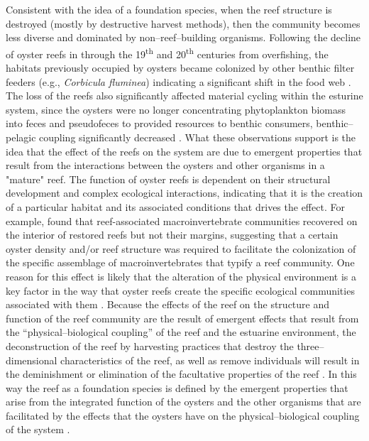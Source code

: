\documentclass{article}
\begin{document}
Consistent with the idea of a foundation species, when the reef structure is destroyed (mostly by destructive harvest methods), then the community becomes less diverse and dominated by non--reef--building organisms. Following the decline of oyster reefs in through the 19\textsuperscript{th} and 20\textsuperscript{th} centuries from overfishing, the habitats previously occupied by oysters became colonized by other benthic filter feeders (e.g., \emph{Corbicula fluminea}) indicating a significant shift in the food web \cite{newell_ecological_1988}. The loss of the reefs also significantly affected material cycling within the esturine system, since the oysters were no longer concentrating phytoplankton biomass into feces and pseudofeces to provided resources to benthic consumers, benthic--pelagic coupling significantly decreased \cite{newell_ecological_1988}. What these observations support is the idea that the effect of the reefs on the system are due to emergent properties that result from the interactions between the oysters and other organisms in a "mature" reef. The function of oyster reefs is dependent on their structural development and complex ecological interactions, indicating that it is the creation of a particular habitat and its associated conditions that drives the effect. For example,  found that reef-associated macroinvertebrate communities recovered on the interior of restored reefs but not their margins, suggesting that a certain oyster density and/or reef structure was required to facilitate the colonization of the specific assemblage of  macroinvertebrates that typify a reef community. One reason for this effect is likely that the alteration of the physical environment is a key factor in the way that oyster reefs create the specific ecological communities associated with them \cite{lenihan_physicalbiological_1999, searles_oyster_2022}. Because the effects of the reef on the structure and function of the reef community are the result of emergent effects that result from the ``physical--biological coupling'' of the reef and the estuarine environment, the deconstruction of the reef by harvesting practices that destroy the three--dimensional characteristics of the reef, as well as remove individuals will result in the deminishment or elimination of the facultative properties of the reef \cite{lenihan_physicalbiological_1999}. In this way the reef as a foundation species is defined by the emergent properties that arise from the integrated function of the oysters and the other organisms that are facilitated by the effects that the oysters have on the physical--biological coupling of the system \cite{lenihan_physicalbiological_1999, ellison_loss_2005, angelini_interactions_2011}. 
\end{document}
